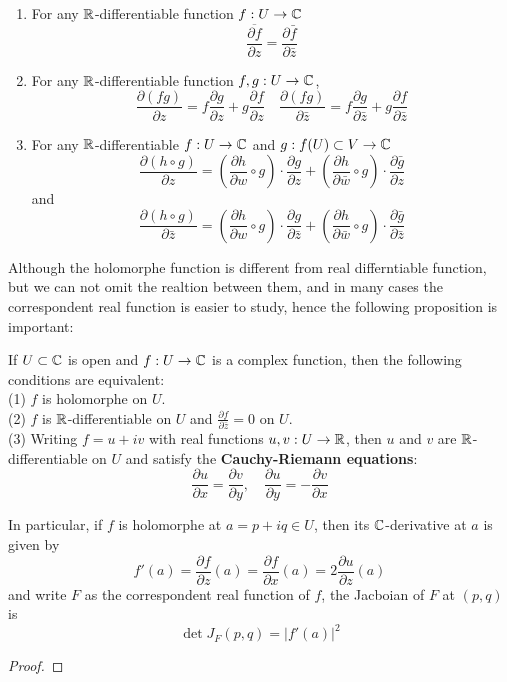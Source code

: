 \begin{enumerate}
    \item For any \(\mathbb{R}\)-differentiable function \(f:U \to \mathbb{C}\)
    \[\overline{\frac{\partial f}{\partial z}} = \frac{\partial \bar{f}}{\partial \bar{z}}\]
    \item For any \(\mathbb{R}\)-differentiable function \(f,g:U \to \mathbb{C}\),
    \[\frac{\partial (fg)}{\partial z} = f \frac{\partial g}{\partial z} + g \frac{\partial f}{\partial z} \quad \frac{\partial (fg)}{\partial \bar{z}} = f \frac{\partial g}{\partial \bar{z}} + g \frac{\partial f}{\partial \bar{z}}\]
    \item For any \(\mathbb{R}\)-differentiable \(f:U \to \mathbb{C}\) and \(g: f(U) \subset V \to \mathbb{C}\)
    \[\frac{\partial (h \circ g)}{\partial z} = (\frac{\partial h}{\partial w}\circ g) \cdot \frac{\partial g}{\partial z} + (\frac{\partial h}{\partial \bar{w}}\circ g) \cdot \frac{\partial \bar{g}}{\partial z}\]
    and 
    \[\frac{\partial (h \circ g)}{\partial \bar{z}} = (\frac{\partial h}{\partial w}\circ g) \cdot \frac{\partial g}{\partial \bar{z}} + (\frac{\partial h}{\partial \bar{w}}\circ g) \cdot \frac{\partial \bar{g}}{\partial \bar{z}}\]

\end{enumerate}

Although the holomorphe function is different from real differntiable function, but we can not omit the realtion between them, and in many cases the correspondent real function is easier to study, hence the following proposition is important:
\begin{proposition}
    If \(U \subset \mathbb{C}\) is open and \(f:U \to \mathbb{C}\) is a complex function, then the following conditions are equivalent:\\
    (1) \(f\) is holomorphe on \(U\).\\

    (2) \(f\) is \(\mathbb{R}\)-differentiable on \(U\) and \(\frac{\partial f}{\partial \bar{z}} = 0\) on \(U\).\\

    (3) Writing \(f = u + iv\) with real functions \(u,v:U \to \mathbb{R}\), then \(u\) and \(v\) are \(\mathbb{R}\)-differentiable on \(U\) and satisfy the \textbf{Cauchy-Riemann equations}:
    \[\frac{\partial u}{\partial x} = \frac{\partial v}{\partial y}, \quad \frac{\partial u}{\partial y} = -\frac{\partial v}{\partial x}\]

    In particular, if \(f\) is holomorphe at \(a = p+iq \in U\), then its \(\mathbb{C}\)-derivative at \(a\) is given by
    \[f'(a) = \frac{\partial f}{\partial z}(a) = \frac{\partial f}{\partial x}(a) = 2 \frac{\partial u}{\partial z}(a)\]
    and write \(F\) as the correspondent real function of \(f\), the Jacboian of \(F\) at \((p,q)\) is
    \[\det J_F(p,q) = |f'(a)|^2\]
\end{proposition}
\begin{proof}
    
\end{proof}

